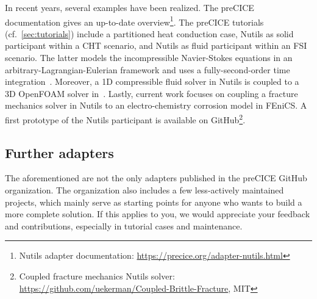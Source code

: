  


In recent years, several examples have been realized. The preCICE documentation gives an up-to-date overview\footnote{Nutils adapter documentation: \url{https://precice.org/adapter-nutils.html}}. The preCICE tutorials (cf.~\autoref{sec:tutorials}) include a partitioned heat conduction case, Nutils as solid participant within a CHT scenario, and Nutils as fluid participant within an FSI scenario. The latter models the incompressible Navier-Stokes equations in an arbitrary-Lagrangian-Eulerian framework and uses a fully-second-order time integration~\cite{QNWI}. 
Moreover, a 1D compressible fluid solver in Nutils is coupled to a 3D OpenFOAM solver in~\cite{Chourdakis2019_OFW14}. Lastly, current work focuses on coupling a fracture mechanics solver in Nutils to an electro-chemistry corrosion model in FEniCS. A first prototype of the Nutils participant is available on GitHub\footnote{Coupled fracture mechanics Nutils solver: \url{https://github.com/uekerman/Coupled-Brittle-Fracture}, MIT}. 

\subsection{Further adapters} 

The aforementioned are not the only adapters published in the preCICE GitHub organization.
The organization also includes a few less-actively maintained projects, which mainly serve as
starting points for anyone who wants to build a more complete solution.
If this applies to you, we would appreciate your feedback and contributions, especially in tutorial
cases and maintenance.

